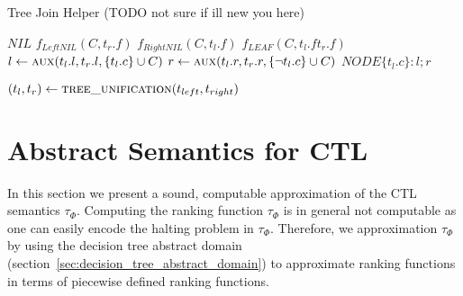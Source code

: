 \documentclass[11pt,a4paper,titlepage]{article}
\begin{document}
\begin{algorithm}                      
    \caption{Tree Join Helper (TODO not sure if ill new you here)}         
    \label{alg:tree_join_helper}       
    \begin{algorithmic}


            \State \Return $NIL$
            \State \Return $f_{LeftNIL}(C, t_r.f)$
            \State \Return $f_{RightNIL}(C, t_l.f)$
            \State \Return $f_{LEAF}(C, t_l.f t_r.f)$
        \Else
            \State $l \gets \Call{aux}{t_l.l, t_r.l,  \{t_l.c\} \cup C}$
            \State $r \gets \Call{aux}{t_l.r, t_r.r, \{\neg t_l.c\} \cup C}$
            \State \Return $NODE\{t_l.c\} \colon l ; r $
        \EndIf

        \EndFunction

        \State $(t_l, t_r) \gets \Call{tree\_unification}{t_{left}, t_{right}}$
        \State \Return {}
        \EndFunction
\end{algorithmic}
\end{algorithm}




\section{Abstract Semantics for CTL}\label{sec:abstract_ctl_semantics}

In this section we present a sound, computable approximation of the CTL semantics $\tau_\Phi$.
Computing the ranking function $\tau_\Phi$ is in general not computable as one can easily encode the 
halting problem in $\tau_\Phi$. Therefore, we approximation $\tau_\Phi$ by using
the decision tree abstract domain (section~\ref{sec:decision_tree_abstract_domain}) to approximate ranking functions 
in terms of piecewise defined ranking functions.
\end{document}
